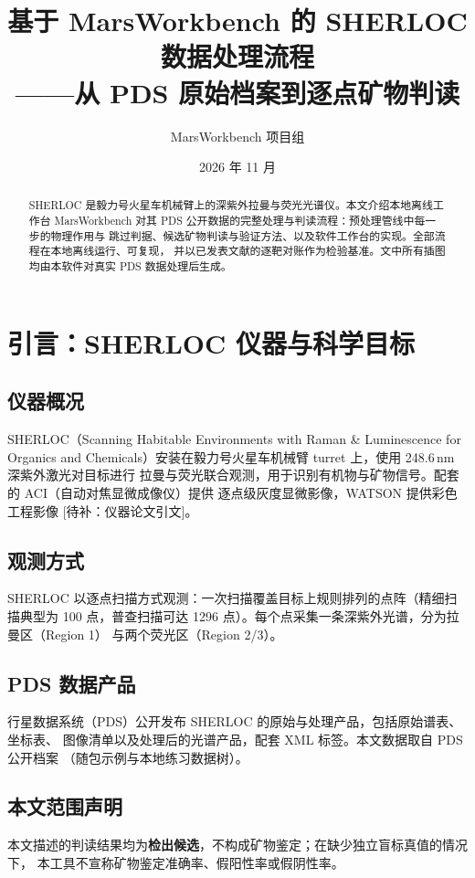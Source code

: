 \documentclass[11pt,a4paper]{ctexart}
\title{\textbf{基于 MarsWorkbench 的 SHERLOC 数据处理流程}\\ \large ——从 PDS 原始档案到逐点矿物判读}
\author{MarsWorkbench 项目组}
\date{2026 年 11 月}
\begin{document}
\maketitle

\begin{abstract}
SHERLOC 是毅力号火星车机械臂上的深紫外拉曼与荧光光谱仪。本文介绍本地离线工作台
MarsWorkbench 对其 PDS 公开数据的完整处理与判读流程：预处理管线中每一步的物理作用与
跳过判据、候选矿物判读与验证方法、以及软件工作台的实现。全部流程在本地离线运行、可复现，
并以已发表文献的逐靶对账作为检验基准。文中所有插图均由本软件对真实 PDS 数据处理后生成。
\end{abstract}

\tableofcontents

\section{引言：SHERLOC 仪器与科学目标}

\subsection{仪器概况}
SHERLOC（Scanning Habitable Environments with Raman \& Luminescence for Organics and
Chemicals）安装在毅力号火星车机械臂 turret 上，使用 248.6\,nm 深紫外激光对目标进行
拉曼与荧光联合观测，用于识别有机物与矿物信号。配套的 ACI（自动对焦显微成像仪）提供
逐点级灰度显微影像，WATSON 提供彩色工程影像 [待补：仪器论文引文]。

\subsection{观测方式}
SHERLOC 以逐点扫描方式观测：一次扫描覆盖目标上规则排列的点阵（精细扫描典型为
100 点，普查扫描可达 1296 点）。每个点采集一条深紫外光谱，分为拉曼区（Region 1）
与两个荧光区（Region 2/3）。

\subsection{PDS 数据产品}
行星数据系统（PDS）公开发布 SHERLOC 的原始与处理产品，包括原始谱表、坐标表、
图像清单以及处理后的光谱产品，配套 XML 标签。本文数据取自 PDS 公开档案
（随包示例与本地练习数据树）。

\subsection{本文范围声明}
本文描述的判读结果均为\textbf{检出候选}，不构成矿物鉴定；在缺少独立盲标真值的情况下，
本工具不宣称矿物鉴定准确率、假阳性率或假阴性率。
\end{document}
